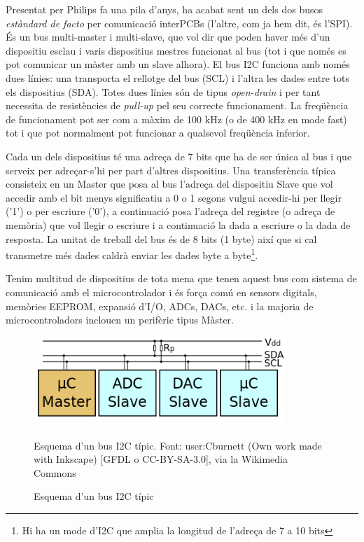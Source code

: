Presentat per Philips fa una pila d'anys, ha acabat sent un dels dos busos {\em estàndard de facto} per comunicació interPCBs (l'altre, com ja hem dit, és l'\gls{SPI}). És un bus multi-master i multi-slave, que vol dir que poden haver més d'un dispositiu esclau i varis dispositius mestres funcionat al bus (tot i que només es pot comunicar un màster amb un slave alhora). El bus I2C funciona amb només dues línies: una transporta el rellotge del bus (\gls{SCL}) i l'altra les dades entre tots els dispositius (\gls{SDA}). Totes dues línies són de tipus {\em open-drain} i per tant necessita de resistències de {\em pull-up} pel seu correcte funcionament. La freqüència de funcionament pot ser com a màxim de 100 kHz (o de 400 kHz en mode fast) tot i que pot normalment pot funcionar a qualsevol freqüència inferior.

Cada un dels dispositius té una adreça de 7 bits que ha de ser única al bus i que serveix per adreçar-s'hi per part d'altres dispositius. Una transferència típica consisteix en un Master que posa al bus l'adreça del dispositiu Slave que vol accedir amb el bit menys significatiu a 0 o 1 segons vulgui accedir-hi per llegir ('1') o per escriure ('0'), a continuació posa l'adreça del registre (o adreça de memòria) que vol llegir o escriure i a continuació la dada a escriure o la dada de resposta. La unitat de treball del bus és de 8 bits (1 byte) així que si cal transmetre més dades caldrà enviar les dades byte a byte\footnote{Hi ha un mode d'I2C que amplia la longitud de l'adreça de 7 a 10 bits}.

Tenim multitud de dispositius de tota mena que tenen aquest bus com sistema de comunicació amb el microcontrolador i és força comú en sensors digitals, memòries EEPROM, expansió d'I/O, \glspl{ADC}, \glspl{DAC}, etc. i la majoria de microcontroladors inclouen un perifèric tipus Màster.

\begin{figure}
 \centering
 \includegraphics[width=0.85\textwidth, keepaspectratio]{imatges/I2C.png}
 \caption{Esquema d'un bus I2C típic}{Esquema d'un bus I2C típic. Font: user:Cburnett (Own work made with Inkscape) [GFDL o CC-BY-SA-3.0], via la Wikimedia Commons}
 \label{fig:I2C}
\end{figure}


